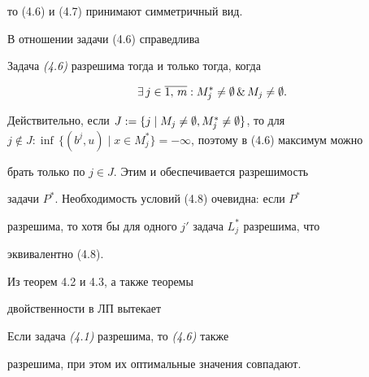 то (4.6) и (4.7) принимают симметричный вид.





В отношении задачи (4.6) справедлива





\begin{thms}


Задача {\em (4.6)} разрешима тогда и только тогда, когда


\begin{equation}


\exists\, j \in \overline{1,\, m}: M_j^* \ne \emp \,\& \, M_j \ne \emp.


\end{equation}


\end{thms}





\begin{pf} Действительно, если $J:= \{ j \mid M_j \ne \emp, M_j^*


\ne \emp \}$, то для $j \notin J: \inf\, \{ (b^j, u) \mid x


\in M_j^* \} = -\infty$, поэтому в (4.6) максимум можно


брать только по $j \in J$. Этим и обеспечивается разрешимость


задачи $P^*$. Необходимость условий (4.8) очевидна: если $P^*$


разрешима, то хотя бы для одного $j'$ задача $L_j^*$ разрешима, что


эквивалентно (4.8).


\end{pf}





Из теорем 4.2 и 4.3, а также теоремы


двойственности в ЛП вытекает





\begin{thms}


Если задача {\em (4.1)} разрешима, то {\em (4.6)} также


разрешима, при этом их оптимальные значения совпадают.


\end{thms}





